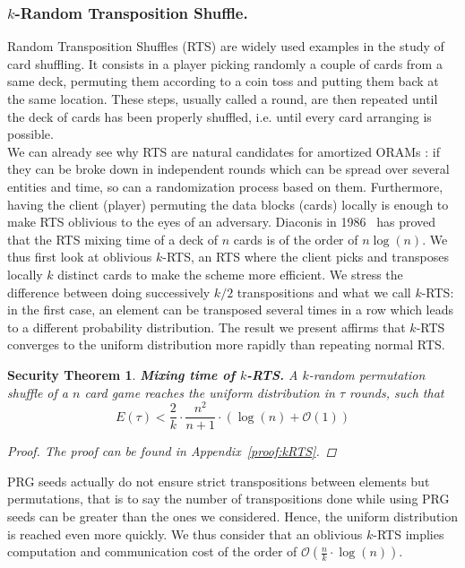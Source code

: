 \documentclass{llncs}
\newtheorem{secthm}{Security Theorem}
\begin{document}
\subsubsection{$k$-Random Transposition Shuffle.}\label{kRTS}
Random Transposition Shuffles (RTS) are widely used examples in the study of card shuffling. It consists in a player picking randomly a couple of cards from a same deck, permuting them according to a coin toss and putting them back at the same location.
These steps, usually called a round, are then repeated until the deck of cards has been properly shuffled, i.e. until every card arranging is possible.\\
We can already see why RTS are natural candidates for amortized ORAMs : if they can be broke down in independent rounds which can be spread over several entities and time, so can a randomization process based on them. Furthermore, having the client (player) permuting the data blocks (cards) locally is enough to make RTS oblivious to the eyes of an adversary.
Diaconis in 1986~\cite{aldous1986shuffling} has proved that the RTS mixing time of a deck of $n$ cards is of the order of $n\log(n)$. We thus first look at oblivious $k$-RTS, an RTS where the client picks and transposes locally $k$ distinct cards to make the scheme more efficient. We stress the difference between doing successively $k/2$ transpositions and what we call $k$-RTS: in the first case, an element can be transposed several times in a row which leads to a different probability distribution. The result we present affirms that  $k$-RTS converges to the uniform distribution more rapidly than repeating normal RTS.  

\begin{secthm}
\textbf{Mixing time of $k$-RTS.} A $k$-random permutation shuffle of a $n$ card game reaches the uniform distribution in $\tau$ rounds, such that
$$E(\tau) < \frac{2}{k}\cdot\frac{n^2}{n+1}\cdot \left ( \log(n) + \mathcal{O}(1) \right ) $$
\begin{proof}
The proof can be found in Appendix~\ref{proof:kRTS}.
\end{proof}
\end{secthm}

PRG seeds actually do not ensure strict transpositions between elements but permutations, that is to say the number of transpositions done while using PRG seeds can be greater than the ones we considered. Hence, the uniform distribution is reached even more quickly. We thus consider that an oblivious $k$-RTS implies computation and communication cost of the order of $\mathcal{O} \left(\frac{n}{k}\cdot \log(n)\right)$.\\
\end{document}
